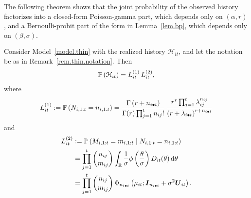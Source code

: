 The following theorem shows that the joint probability of the observed
history factorizes into a closed-form Poisson-gamma part, which depends
only on \((\alpha,r)\), and a Bernoulli-probit part of the form in
Lemma~\ref{lem.bp}, which depends only on \((\beta,\sigma)\).

\begin{theorem}
\label{thm.thin.lik}
Consider Model~\ref{model.thin} with the realized history
\(\mathcal H_{it}\), and let the notation be as in
Remark~\ref{rem.thin.notation}. Then
\begin{equation}\label{eq.thin.factorization}
\P{\mathcal H_{it}}
=
L^{(1)}_{it}\,L^{(2)}_{it},
\end{equation}
where
\begin{equation}\label{eq.thin.L1}
L^{(1)}_{it}
:=
\P{N_{i,1:t}=n_{i,1:t}}
=
\frac{\Gamma\left(r+n_{i\bullet t}\right)}
{\Gamma(r)\prod_{j=1}^t n_{ij}!}
\,
\frac{r^r\prod_{j=1}^t\lambda_{ij}^{n_{ij}}}
{\left(r+\lambda_{i\bullet t}\right)^{r+n_{i\bullet t}}}
\end{equation}
and
\begin{equation}\label{eq.thin.L2}
\begin{aligned}
L^{(2)}_{it}
&:=
\P{M_{i,1:t}=m_{i,1:t}\mid N_{i,1:t}=n_{i,1:t}}\\
&=
\prod_{j=1}^t\binom{n_{ij}}{m_{ij}}
\int_{\Real}
\frac{1}{\sigma}\phi\left(\frac{\theta}{\sigma}\right)
D_{it}(\theta)
\,{\rm d}\theta\\
&=
\prod_{j=1}^t\binom{n_{ij}}{m_{ij}}
\,
\Phi_{n_{i\bullet t}}
\left(
\mu_{it};
\boldsymbol I_{n_{i\bullet t}}
+
\sigma^2\boldsymbol U_{it}
\right).
\end{aligned}
\end{equation}
\end{theorem}

